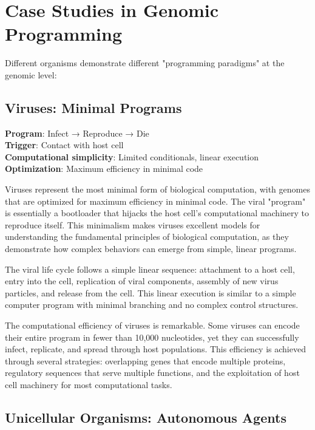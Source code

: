 \documentclass[11pt]{article}
\begin{document}
\section{Case Studies in Genomic Programming}

Different organisms demonstrate different "programming paradigms" at the genomic level:

\subsection{Viruses: Minimal Programs}

\textbf{Program}: Infect → Reproduce → Die\\
\textbf{Trigger}: Contact with host cell\\
\textbf{Computational simplicity}: Limited conditionals, linear execution\\
\textbf{Optimization}: Maximum efficiency in minimal code

Viruses represent the most minimal form of biological computation, with genomes that are optimized for maximum efficiency in minimal code. The viral "program" is essentially a bootloader that hijacks the host cell's computational machinery to reproduce itself. This minimalism makes viruses excellent models for understanding the fundamental principles of biological computation, as they demonstrate how complex behaviors can emerge from simple, linear programs.

The viral life cycle follows a simple linear sequence: attachment to a host cell, entry into the cell, replication of viral components, assembly of new virus particles, and release from the cell. This linear execution is similar to a simple computer program with minimal branching and no complex control structures.

The computational efficiency of viruses is remarkable. Some viruses can encode their entire program in fewer than 10,000 nucleotides, yet they can successfully infect, replicate, and spread through host populations. This efficiency is achieved through several strategies: overlapping genes that encode multiple proteins, regulatory sequences that serve multiple functions, and the exploitation of host cell machinery for most computational tasks.

\subsection{Unicellular Organisms: Autonomous Agents}
\end{document}
